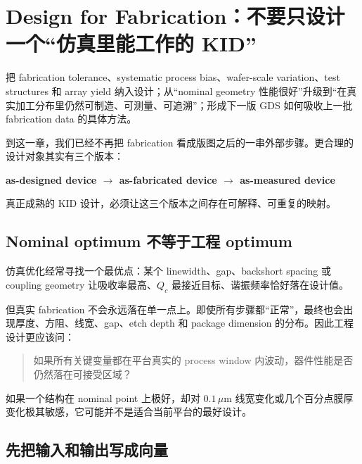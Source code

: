 \chapter{Design for Fabrication：不要只设计一个“仿真里能工作的 KID”}

\begin{chaptergoal}
把 fabrication tolerance、systematic process bias、wafer-scale variation、test structures 和 array yield 纳入设计；从“nominal geometry 性能很好”升级到“在真实加工分布里仍然可制造、可测量、可追溯”；形成下一版 GDS 如何吸收上一批 fabrication data 的具体方法。
\end{chaptergoal}

到这一章，我们已经不再把 fabrication 看成版图之后的一串外部步骤。更合理的设计对象其实有三个版本：

\begin{center}
\textbf{as-designed device $\rightarrow$ as-fabricated device $\rightarrow$ as-measured device}
\end{center}

真正成熟的 KID 设计，必须让这三个版本之间存在可解释、可重复的映射。


\section{Nominal optimum 不等于工程 optimum}

仿真优化经常寻找一个最优点：某个 linewidth、gap、backshort spacing 或 coupling geometry 让吸收率最高、$Q_c$ 最接近目标、谐振频率恰好落在设计值。

但真实 fabrication 不会永远落在单一点上。即使所有步骤都“正常”，最终也会出现厚度、方阻、线宽、gap、etch depth 和 package dimension 的分布。因此工程设计更应该问：

\begin{quote}
如果所有关键变量都在平台真实的 process window 内波动，器件性能是否仍然落在可接受区域？
\end{quote}

如果一个结构在 nominal point 上极好，却对 $0.1\,\mu\mathrm{m}$ 线宽变化或几个百分点膜厚变化极其敏感，它可能并不是适合当前平台的最好设计。

\section{先把输入和输出写成向量}

